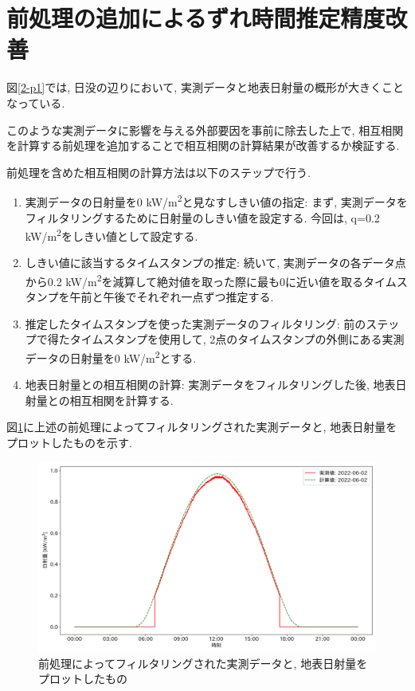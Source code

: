 \section{前処理の追加によるずれ時間推定精度改善}

図\ref{2-p1}では, 日没の辺りにおいて, 実測データと地表日射量の概形が大きくことなっている.

このような実測データに影響を与える外部要因を事前に除去した上で, 相互相関を計算する前処理を追加することで相互相関の計算結果が改善するか検証する.

前処理を含めた相互相関の計算方法は以下のステップで行う.

\begin{enumerate}
  \item 実測データの日射量を0 \si{\kilo\watt}/\si{\metre\squared}と見なすしきい値の指定: まず, 実測データをフィルタリングするために日射量のしきい値を設定する. 今回は, q=0.2 \si{\kilo\watt}/\si{\metre\squared}をしきい値として設定する.
  \item しきい値に該当するタイムスタンプの推定: 続いて, 実測データの各データ点から0.2 \si{\kilo\watt}/\si{\metre\squared}を減算して絶対値を取った際に最も0に近い値を取るタイムスタンプを午前と午後でそれぞれ一点ずつ推定する.
  \item 推定したタイムスタンプを使った実測データのフィルタリング: 前のステップで得たタイムスタンプを使用して, 2点のタイムスタンプの外側にある実測データの日射量を0 \si{\kilo\watt}/\si{\metre\squared}とする.
  \item 地表日射量との相互相関の計算: 実測データをフィルタリングした後, 地表日射量との相互相関を計算する.
\end{enumerate}

図\ref{2-p2}に上述の前処理によってフィルタリングされた実測データと, 地表日射量をプロットしたものを示す.

\begin{figure}[h]
  \begin{center}
    \includegraphics[width=160mm]{sotu/figure/2/drop-under-0.2-q.png}
    \caption{前処理によってフィルタリングされた実測データと, 地表日射量をプロットしたもの}
    \label{2-p2}
  \end{center}
\end{figure}

